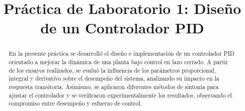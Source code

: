 \title{Práctica de Laboratorio 1: Diseño de un Controlador PID}
\author{
	\and
	\and
	\and
		
}

\maketitle

\begin{abstract}
	En la presente práctica se desarrolló el diseño e implementación de un controlador PID orientado a mejorar la dinámica de una planta bajo control en lazo cerrado. A partir de los ensayos realizados, se evaluó la influencia de los parámetros proporcional, integral y derivativo sobre el desempeño del sistema, analizando su impacto en la respuesta transitoria. Asimismo, se aplicaron diferentes métodos de sintonía para ajustar el controlador y se verificaron experimentalmente los resultados, observando el compromiso entre desempeño y esfuerzo de control.
\end{abstract}


